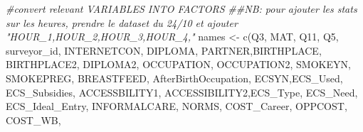 \documentclass[
]{article}
\newenvironment{Shaded}{}{}
\newcommand{\CommentTok}[1]{\textcolor[rgb]{0.38,0.63,0.69}{\textit{#1}}}
\newcommand{\DocumentationTok}[1]{\textcolor[rgb]{0.73,0.13,0.13}{\textit{#1}}}
\newcommand{\FunctionTok}[1]{\textcolor[rgb]{0.02,0.16,0.49}{#1}}
\newcommand{\NormalTok}[1]{#1}
\newcommand{\OtherTok}[1]{\textcolor[rgb]{0.00,0.44,0.13}{#1}}
\newcommand{\StringTok}[1]{\textcolor[rgb]{0.25,0.44,0.63}{#1}}
\begin{document}
\begin{Shaded}
\begin{Highlighting}[]
\CommentTok{\#convert relevant VARIABLES INTO FACTORS}
\DocumentationTok{\#\#NB: pour ajouter les stats sur les heures, prendre le dataset du 24/10 et ajouter "\textquotesingle{}HOUR\_1\textquotesingle{},\textquotesingle{}HOUR\_2\textquotesingle{},\textquotesingle{}HOUR\_3\textquotesingle{},\textquotesingle{}HOUR\_4\textquotesingle{},"}
\NormalTok{names }\OtherTok{\textless{}{-}} \FunctionTok{c}\NormalTok{(}\StringTok{\textquotesingle{}Q3\textquotesingle{}}\NormalTok{, }\StringTok{\textquotesingle{}MAT\textquotesingle{}}\NormalTok{, }\StringTok{\textquotesingle{}Q11\textquotesingle{}}\NormalTok{, }\StringTok{\textquotesingle{}Q5\textquotesingle{}}\NormalTok{, }\StringTok{\textquotesingle{}surveyor\_id\textquotesingle{}}\NormalTok{,}
           \StringTok{\textquotesingle{}INTERNETCON\textquotesingle{}}\NormalTok{, }\StringTok{\textquotesingle{}DIPLOMA\textquotesingle{}}\NormalTok{, }
           \StringTok{\textquotesingle{}PARTNER\textquotesingle{}}\NormalTok{,}\StringTok{\textquotesingle{}BIRTHPLACE\textquotesingle{}}\NormalTok{, }\StringTok{\textquotesingle{}BIRTHPLACE2\textquotesingle{}}\NormalTok{, }\StringTok{\textquotesingle{}DIPLOMA2\textquotesingle{}}\NormalTok{, }\StringTok{\textquotesingle{}OCCUPATION\textquotesingle{}}\NormalTok{, }\StringTok{\textquotesingle{}OCCUPATION2\textquotesingle{}}\NormalTok{,}
           \StringTok{\textquotesingle{}SMOKEYN\textquotesingle{}}\NormalTok{, }\StringTok{\textquotesingle{}SMOKEPREG\textquotesingle{}}\NormalTok{, }\StringTok{\textquotesingle{}BREASTFEED\textquotesingle{}}\NormalTok{, }\StringTok{\textquotesingle{}AfterBirthOccupation\textquotesingle{}}\NormalTok{,}
           \StringTok{\textquotesingle{}ECSYN\textquotesingle{}}\NormalTok{,}\StringTok{\textquotesingle{}ECS\_Used\textquotesingle{}}\NormalTok{, }\StringTok{\textquotesingle{}ECS\_Subsidies\textquotesingle{}}\NormalTok{, }\StringTok{\textquotesingle{}ACCESSBILITY1\textquotesingle{}}\NormalTok{, }\StringTok{\textquotesingle{}ACCESSIBILITY2\textquotesingle{}}\NormalTok{,}\StringTok{\textquotesingle{}ECS\_Type\textquotesingle{}}\NormalTok{, }\StringTok{\textquotesingle{}ECS\_Need\textquotesingle{}}\NormalTok{, }\StringTok{\textquotesingle{}ECS\_Ideal\_Entry\textquotesingle{}}\NormalTok{,}
           \StringTok{\textquotesingle{}INFORMALCARE\textquotesingle{}}\NormalTok{, }\StringTok{\textquotesingle{}NORMS\textquotesingle{}}\NormalTok{, }\StringTok{\textquotesingle{}COST\_Career\textquotesingle{}}\NormalTok{, }\StringTok{\textquotesingle{}OPPCOST\textquotesingle{}}\NormalTok{, }\StringTok{\textquotesingle{}COST\_WB\textquotesingle{}}\NormalTok{,}

\end{Highlighting}
\end{Shaded}
\end{document}

